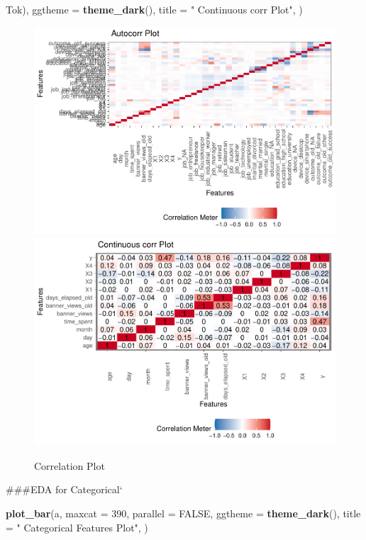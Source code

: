 \documentclass[
]{article}
\newenvironment{Shaded}{\begin{snugshade}}{\end{snugshade}}
\newcommand{\DataTypeTok}[1]{\textcolor[rgb]{0.13,0.29,0.53}{#1}}
\newcommand{\DecValTok}[1]{\textcolor[rgb]{0.00,0.00,0.81}{#1}}
\newcommand{\KeywordTok}[1]{\textcolor[rgb]{0.13,0.29,0.53}{\textbf{#1}}}
\newcommand{\NormalTok}[1]{#1}
\newcommand{\OtherTok}[1]{\textcolor[rgb]{0.56,0.35,0.01}{#1}}
\newcommand{\StringTok}[1]{\textcolor[rgb]{0.31,0.60,0.02}{#1}}
\begin{document}
\begin{Shaded}
\begin{Highlighting}[]
Tok{),  }
             \DataTypeTok{ggtheme =} \KeywordTok{theme_dark}\NormalTok{(),}
             \DataTypeTok{title =} \StringTok{" Continuous corr Plot"}\NormalTok{,}
\NormalTok{             )  }
\end{Highlighting}
\end{Shaded}

\begin{figure}

{\centering \includegraphics[width=0.75\linewidth]{report_files/figure-latex/Correlation Plot-1} \includegraphics[width=0.75\linewidth]{report_files/figure-latex/Correlation Plot-2} 

}

\caption{Correlation Plot}\label{fig:Correlation Plot}
\end{figure}

\#\#\#EDA for Categorical`

\begin{Shaded}
\begin{Highlighting}[]
\KeywordTok{plot_bar}\NormalTok{(a, }\DataTypeTok{maxcat =} \DecValTok{390}\NormalTok{, }\DataTypeTok{parallel =} \OtherTok{FALSE}\NormalTok{,  }
             \DataTypeTok{ggtheme =} \KeywordTok{theme_dark}\NormalTok{(),}
             \DataTypeTok{title =} \StringTok{" Categorical Features Plot"}\NormalTok{,}
\NormalTok{             )}
\end{Highlighting}
\end{Shaded}
\end{document}
